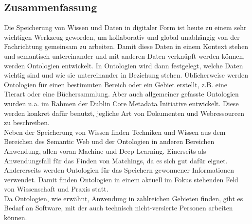 %
\pagestyle{empty}

\subsection*{Zusammenfassung}

Die Speicherung von Wissen und Daten in digitaler Form ist heute zu einem sehr
wichtigen Werkzeug geworden, um kollaborativ und global unabhängig von der Fachrichtung gemeinsam zu arbeiten. Damit diese Daten in einem Kontext stehen und semantisch untereinander und mit anderen Daten verknüpft werden können, werden Ontologien entwickelt. In Ontologien wird dann festgelegt, welche Daten wichtig sind und wie sie untereinander in Beziehung stehen. Üblicherweise werden Ontologien für einen bestimmten Bereich oder ein Gebiet erstellt, z.B. eine Tierart oder eine Büchersammlung. Aber auch allgemeiner gefasste Ontologien wurden u.a. im Rahmen der Dublin Core Metadata Initiative  entwickelt. Diese werden konkret dafür benutzt, jegliche Art von Dokumenten und Webressourcen zu beschreiben.\\
Neben der Speicherung von Wissen finden Techniken und Wissen aus dem Bereichen
des Semantic Web und der Ontologien in anderen Bereichen Anwendung, allen voran
Machine und Deep Learning. Einerseits als Anwendungsfall für das Finden von
Matchings, da es sich gut dafür eignet. Andererseits werden Ontologien für das Speichern gewonnener Informationen verwendet. Damit finden Ontologien in einem aktuell im Fokus stehenden Feld von Wissenschaft und Praxis statt.\\
Da Ontologien, wie erwähnt, Anwendung in zahlreichen Gebieten finden, gibt es
Bedarf an Software, mit der auch technisch nicht-versierte Personen arbeiten können. 

